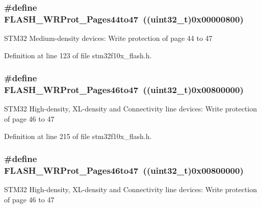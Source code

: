 \subsubsection[{\texorpdfstring{F\+L\+A\+S\+H\+\_\+\+W\+R\+Prot\+\_\+\+Pages44to47}{FLASH_WRProt_Pages44to47}}]{\setlength{\rightskip}{0pt plus 5cm}\#define F\+L\+A\+S\+H\+\_\+\+W\+R\+Prot\+\_\+\+Pages44to47~(({\bf uint32\+\_\+t})0x00000800)}\hypertarget{group___option___bytes___write___protection_gaa2d897455d5f71c9fd3721d49b3578fc}{}\label{group___option___bytes___write___protection_gaa2d897455d5f71c9fd3721d49b3578fc}
S\+T\+M32 Medium-\/density devices\+: Write protection of page 44 to 47 

Definition at line 123 of file stm32f10x\+\_\+flash.\+h.

\subsubsection[{\texorpdfstring{F\+L\+A\+S\+H\+\_\+\+W\+R\+Prot\+\_\+\+Pages46to47}{FLASH_WRProt_Pages46to47}}]{\setlength{\rightskip}{0pt plus 5cm}\#define F\+L\+A\+S\+H\+\_\+\+W\+R\+Prot\+\_\+\+Pages46to47~(({\bf uint32\+\_\+t})0x00800000)}\hypertarget{group___option___bytes___write___protection_ga8c9bd2510c0af75911a6b24271a33c95}{}\label{group___option___bytes___write___protection_ga8c9bd2510c0af75911a6b24271a33c95}
S\+T\+M32 High-\/density, X\+L-\/density and Connectivity line devices\+: Write protection of page 46 to 47 

Definition at line 215 of file stm32f10x\+\_\+flash.\+h.

\subsubsection[{\texorpdfstring{F\+L\+A\+S\+H\+\_\+\+W\+R\+Prot\+\_\+\+Pages46to47}{FLASH_WRProt_Pages46to47}}]{\setlength{\rightskip}{0pt plus 5cm}\#define F\+L\+A\+S\+H\+\_\+\+W\+R\+Prot\+\_\+\+Pages46to47~(({\bf uint32\+\_\+t})0x00800000)}\hypertarget{group___option___bytes___write___protection_ga8c9bd2510c0af75911a6b24271a33c95}{}\label{group___option___bytes___write___protection_ga8c9bd2510c0af75911a6b24271a33c95}
S\+T\+M32 High-\/density, X\+L-\/density and Connectivity line devices\+: Write protection of page 46 to 47 

